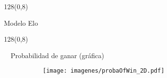 \documentclass[shownotes]{beamer}
\begin{document}
\begin{frame}
 \begin{textblock}{128}(0,8)
\begin{center}
 \large Modelo Elo
\end{center}
\end{textblock}
\vspace{0.75cm}



\end{frame}



\begin{frame}
\begin{textblock}{128}(0,8)
\begin{center}
 \normalsize \ \ Probabilidad de ganar (gr\'afica)
\end{center}
\end{textblock}
\vspace{0.5cm}

 
\begin{figure}[H]     
     \centering
     \begin{subfigure}[b]{0.7\textwidth}
       \texttt{[image: imagenes/probaOfWin\_2D.pdf]} 
     \end{subfigure}
\end{figure}
  
\end{frame}
 
\end{document}
